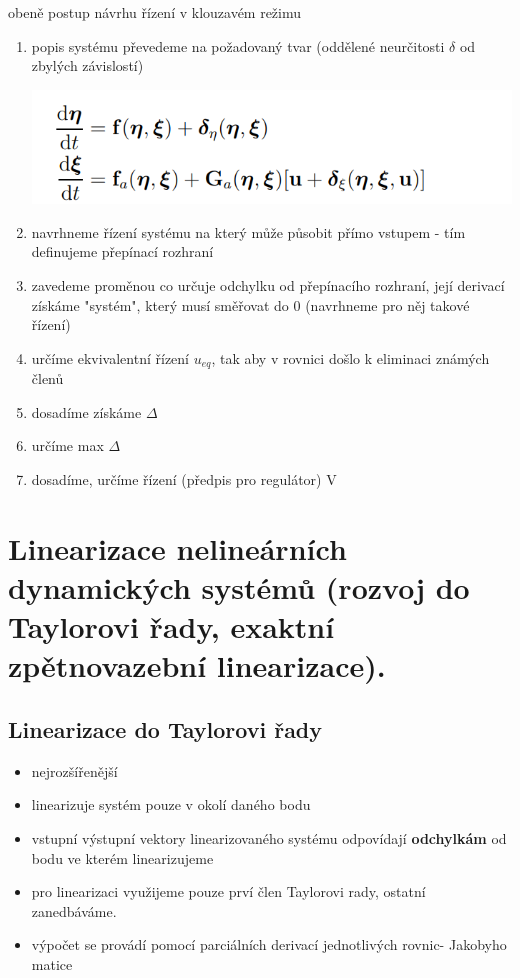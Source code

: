 obeně postup návrhu řízení v klouzavém režimu
\begin{enumerate}
    \item popis systému převedeme na požadovaný tvar (oddělené neurčitosti $\delta $ od zbylých závislostí)
    
    \includegraphics[scale =0.4]{img/klouzavy_tavr.png}
    \item navrhneme řízení systému na který může působit přímo vstupem - tím definujeme přepínací rozhraní
    \item zavedeme proměnou co určuje odchylku od přepínacího rozhraní, její derivací získáme "systém", který musí směřovat do 0 (navrhneme pro něj takové řízení)
    \item určíme ekvivalentní řízení $u_{eq}$, tak aby v rovnici došlo k eliminaci známých členů
    \item dosadíme získáme $\Delta$
    \item určíme max $\Delta$ 
    \item dosadíme, určíme řízení (předpis pro regulátor) V

\end{enumerate}

\section{Linearizace nelineárních dynamických systémů (rozvoj do Taylorovi řady, exaktní zpětnovazební
linearizace).
}

\subsection{Linearizace do Taylorovi řady}
\begin{itemize}
    \item nejrozšířenější 
    \item linearizuje systém pouze v okolí daného bodu
    \item vstupní výstupní vektory linearizovaného systému odpovídají { \bf odchylkám} od bodu ve kterém linearizujeme
    \item pro linearizaci využijeme pouze prví člen Taylorovi rady, ostatní zanedbáváme.
    \item výpočet se provádí pomocí parciálních derivací jednotlivých rovnic- Jakobyho matice
\end{itemize}

